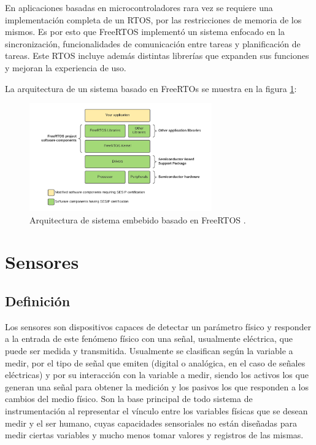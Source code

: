 En aplicaciones basadas en microcontroladores rara vez se requiere una implementación completa de un RTOS, por las restricciones de memoria de los mismos. Es por esto que FreeRTOS implementó un sistema enfocado en la sincronización, funcionalidades de comunicación entre tareas y planificación de tareas. Este RTOS incluye además distintas librerías que expanden sus funciones y mejoran la experiencia de uso.

La arquitectura de un sistema basado en FreeRTOs se muestra en la figura \ref{fig:rtos}:

\begin{figure}[H]
    \centering
    \includegraphics[width = 0.7\textwidth]{imagenes/cap1_marcoteo/FreeRTOSArch.png}
    \caption{Arquitectura de sistema embebido basado en FreeRTOS \citep{rtos}.}
    \label{fig:rtos}
\end{figure}

\section{Sensores}

\subsection{Definición}

Los sensores son dispositivos capaces de detectar un parámetro físico y responder a la entrada de este fenómeno físico con una señal, usualmente eléctrica, que puede ser medida y transmitida. Usualmente se clasifican según la variable a medir, por el tipo de señal que emiten (digital o analógica, en el caso de señales eléctricas) y por su interacción con la variable a medir, siendo los activos los que generan una señal para obtener la medición y los pasivos los que responden a los cambios del medio físico. Son la base principal de todo sistema de instrumentación al representar el vínculo entre los variables físicas que se desean medir y el ser humano, cuyas capacidades sensoriales no están diseñadas para medir ciertas variables y mucho menos tomar valores y registros de las mismas.


